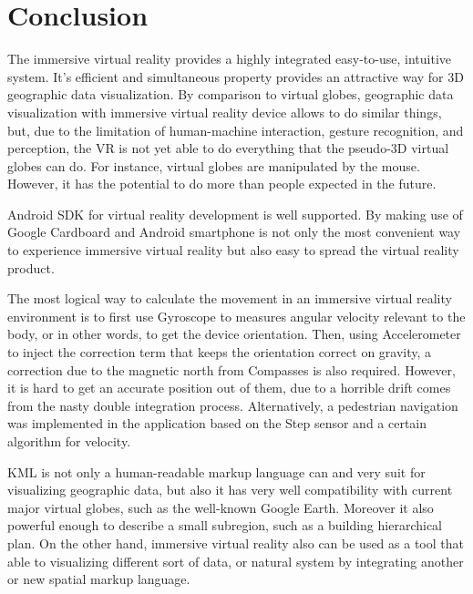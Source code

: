 \chapter{Conclusion}
\label{chapter-conclusion}

The immersive virtual reality provides a highly integrated easy-to-use, intuitive system. It's efficient and simultaneous property provides an attractive way for 3D geographic data visualization. By comparison to virtual globes, geographic data visualization with immersive virtual reality device allows to do similar things, but, due to the limitation of human-machine interaction, gesture recognition, and perception, the VR is not yet able to do everything that the pseudo-3D virtual globes can do. For instance, virtual globes are manipulated by the mouse. However, it has the potential to do more than people expected in the future.

Android SDK for virtual reality development is well supported. By making use of Google Cardboard and Android smartphone is not only the most convenient way to experience immersive virtual reality but also easy to spread the virtual reality product. 

The most logical way to calculate the movement in an immersive virtual reality environment is to first use Gyroscope to measures angular velocity relevant to the body, or in other words, to get the device orientation. Then, using Accelerometer to inject the correction term that keeps the orientation correct on gravity, a correction due to the magnetic north from Compasses is also required. However, it is hard to get an accurate position out of them, due to a horrible drift comes from the nasty double integration process. Alternatively, a pedestrian navigation was implemented in the application based on the Step sensor and a certain algorithm for velocity.

KML is not only a human-readable markup language can and very suit for visualizing geographic data, but also it has very well compatibility with current major virtual globes, such as the well-known Google Earth. Moreover it also powerful enough to describe a small subregion, such as a building hierarchical plan. On the other hand, immersive virtual reality also can be used as a tool that able to visualizing different sort of data, or natural system by integrating another or new spatial markup language.

